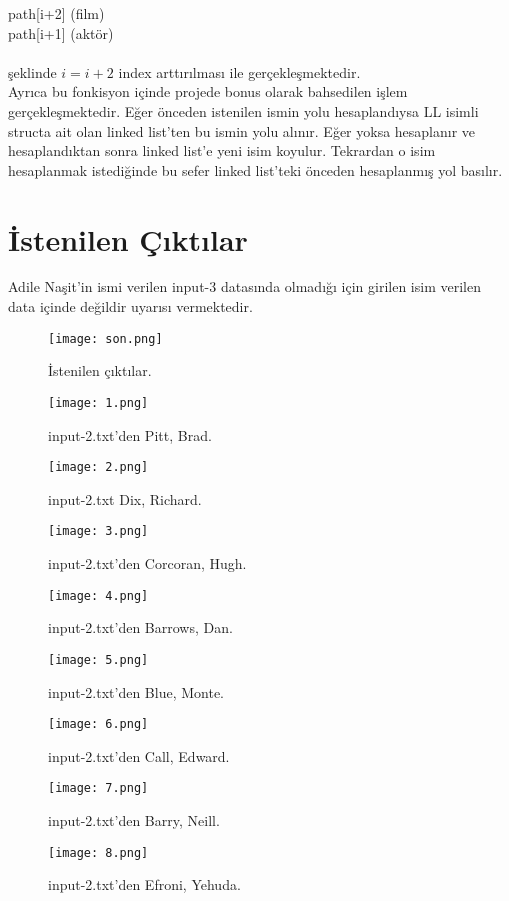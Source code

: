 \documentclass[11pt]{article}
\begin{document}
\begin{itemize}
	\hspace*{2cm} path[i+2] (film)\\
	\hspace*{2cm} path[i+1] (aktör)\\\\
şeklinde $i=i+2$ index arttırılması ile gerçekleşmektedir.
\\Ayrıca bu fonkisyon içinde projede bonus olarak bahsedilen işlem gerçekleşmektedir. Eğer önceden istenilen ismin yolu hesaplandıysa LL isimli structa ait olan linked list'ten bu ismin yolu alınır. Eğer yoksa hesaplanır ve hesaplandıktan sonra linked list'e yeni isim koyulur. Tekrardan o isim hesaplanmak istediğinde bu sefer linked list'teki önceden hesaplanmış yol basılır.
\end{itemize}
\section{İstenilen Çıktılar}
Adile Naşit'in ismi verilen input-3 datasında olmadığı için girilen isim verilen data içinde değildir uyarısı vermektedir.

\begin{figure}[H]
\centering
\texttt{[image: son.png]}
\caption{İstenilen çıktılar.}
\label{fig:figure3}
\end{figure}

\begin{figure}[H]
\centering
\texttt{[image: 1.png]}
\caption{input-2.txt'den Pitt, Brad.}
\label{fig:figure3}
\end{figure}
\begin{figure}[H]
\centering
\texttt{[image: 2.png]}
\caption{input-2.txt Dix, Richard.}
\label{fig:figure3}
\end{figure}
\begin{figure}[H]
\centering
\texttt{[image: 3.png]}
\caption{input-2.txt'den Corcoran, Hugh.}
\label{fig:figure3}
\end{figure}
\begin{figure}[H]
\centering
\texttt{[image: 4.png]}
\caption{input-2.txt'den Barrows, Dan.}
\label{fig:figure3}
\end{figure}
\begin{figure}[H]
\centering
\texttt{[image: 5.png]}
\caption{input-2.txt'den Blue, Monte.}
\label{fig:figure3}
\end{figure}
\begin{figure}[H]
\centering
\texttt{[image: 6.png]}
\caption{input-2.txt'den Call, Edward.}
\label{fig:figure3}
\end{figure}
\begin{figure}[H]
\centering
\texttt{[image: 7.png]}
\caption{input-2.txt'den Barry, Neill.}
\label{fig:figure3}
\end{figure}
\begin{figure}[H]
\centering
\texttt{[image: 8.png]}
\caption{input-2.txt'den Efroni, Yehuda.}
\label{fig:figure3}
\end{figure}
\end{document}
